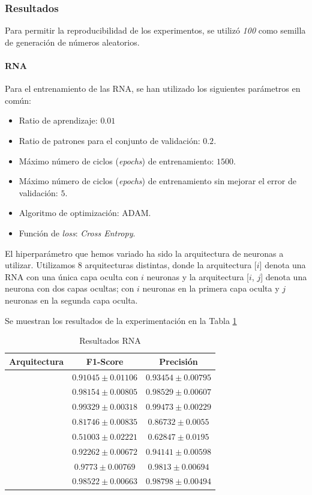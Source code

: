 \documentclass[12pt]{article}
\begin{document}
\subsubsection{Resultados}
Para permitir la reproducibilidad de los experimentos, se utilizó \textit{100} como semilla de generación de números
aleatorios.

\paragraph{RNA}

Para el entrenamiento de las RNA, se han utilizado los siguientes parámetros en común:
\begin{itemize}
	\item Ratio de aprendizaje: $0.01$
	\item Ratio de patrones para el conjunto de validación: $0.2$.
	\item Máximo número de ciclos (\textit{epochs}) de entrenamiento: $1500$.
	\item Máximo número de ciclos (\textit{epochs}) de entrenamiento sin mejorar el error de validación: $5$.
	\item Algoritmo de optimización: ADAM.
	\item Función de \textit{loss}: \textit{Cross Entropy}.
\end{itemize}
El hiperparámetro que hemos variado ha sido la arquitectura de neuronas a utilizar. Utilizamos 8 arquitecturas distintas,
donde la arquitectura [$i$] denota una RNA con una única capa oculta con $i$ neuronas y la arquitectura [$i$, $j$] 
denota una neurona con dos capas ocultas; con $i$ neuronas en la primera capa oculta y $j$ neuronas en la segunda capa oculta.

Se muestran los resultados de la experimentación en la Tabla \ref{Tab:ANN_3}

\begin{table}[!ht]
	\caption{Resultados RNA}
	\centering
		 \begin{tabular}{||c c c||}
			 \hline
			 Arquitectura & F1-Score & Precisión  \\ [0.5ex]
			 \hline\hline
			 [8] & $0.91045 \pm 0.01106$ & $0.93454 \pm 0.00795$ \\
			\hline
			[16] & $0.98154 \pm 0.00805$ & $0.98529 \pm 0.00607$ \\
			\hline
			[32] & $0.99329 \pm 0.00318$ & $0.99473 \pm 0.00229$ \\
			\hline
			[8, 8] & $0.81746 \pm 0.00835$ & $0.86732 \pm 0.0055$ \\
			\hline
			[16, 4] & $0.51003 \pm 0.02221$ & $0.62847 \pm 0.0195$ \\
			\hline
			[16, 8] & $0.92262 \pm 0.00672$ & $0.94141 \pm 0.00598$ \\
			\hline
			[32, 16] & $0.9773 \pm 0.00769$ & $0.9813 \pm 0.00694$ \\
			\hline
			[32, 32] & $0.98522 \pm 0.00663$ & $0.98798 \pm 0.00494$ \\
			\hline
		 \end{tabular}
	\label{Tab:ANN_3}
	\end{table}
\end{document}
